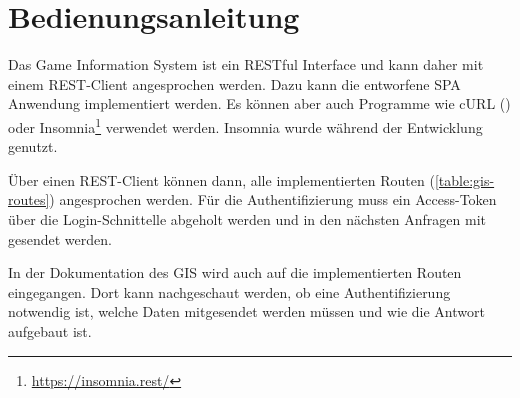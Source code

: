 \section{Bedienungsanleitung}

Das Game Information System ist ein RESTful Interface und kann daher mit einem REST-Client angesprochen werden. Dazu kann die entworfene SPA Anwendung implementiert werden. Es können aber auch Programme wie cURL () oder Insomnia\footnote{\url{https://insomnia.rest/}} verwendet werden. Insomnia wurde während der Entwicklung genutzt.

Über einen REST-Client können dann, alle implementierten Routen (\ref{table:gis-routes}) angesprochen werden. Für die Authentifizierung muss ein Access-Token über die Login-Schnittelle abgeholt werden und in den nächsten Anfragen mit gesendet werden.

In der Dokumentation des GIS wird auch auf die implementierten Routen eingegangen. Dort kann nachgeschaut werden, ob eine Authentifizierung notwendig ist, welche Daten mitgesendet werden müssen und wie die Antwort aufgebaut ist.